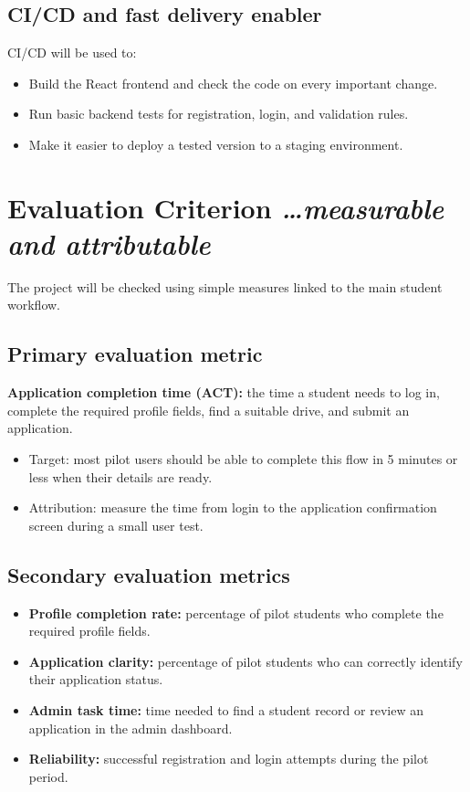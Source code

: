 \documentclass[11pt,a4paper]{article}
\newcommand{\BvrHint}[1]{{\normalfont\normalsize\itshape\hfill #1}}
\begin{document}
\subsection{CI/CD and fast delivery enabler}
CI/CD will be used to:
\begin{itemize}[leftmargin=0.7cm]
  \item Build the React frontend and check the code on every important change.
  \item Run basic backend tests for registration, login, and validation rules.
  \item Make it easier to deploy a tested version to a staging environment.
\end{itemize}

\section{Evaluation Criterion \BvrHint{\ldots measurable and attributable}}
The project will be checked using simple measures linked to the main student workflow.

\subsection{Primary evaluation metric}
\textbf{Application completion time (ACT):} the time a student needs to log in, complete the required profile fields, find a suitable drive, and submit an application.
\begin{itemize}[leftmargin=0.7cm]
  \item Target: most pilot users should be able to complete this flow in 5 minutes or less when their details are ready.
  \item Attribution: measure the time from login to the application confirmation screen during a small user test.
\end{itemize}

\subsection{Secondary evaluation metrics}
\begin{itemize}[leftmargin=0.7cm]
  \item \textbf{Profile completion rate:} percentage of pilot students who complete the required profile fields.
  \item \textbf{Application clarity:} percentage of pilot students who can correctly identify their application status.
  \item \textbf{Admin task time:} time needed to find a student record or review an application in the admin dashboard.
  \item \textbf{Reliability:} successful registration and login attempts during the pilot period.
\end{itemize}
\end{document}
